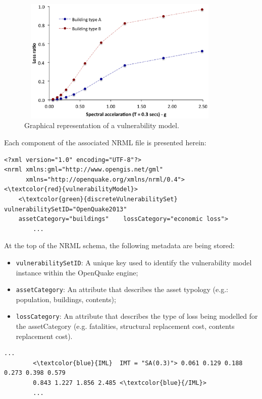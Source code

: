 \begin{figure}[ht]
\centering
\includegraphics[width=10cm,height=6cm]{./figures/risk/vulnerabilityModel.eps}
\caption{Graphical representation of a vulnerability model.}
\label{fig:vulModel}
\end{figure}

Each component of the associated NRML file is presented herein:
 
\begin{Verbatim}[frame=single, commandchars=\\\{\}, samepage=true]
<?xml version="1.0" encoding="UTF-8"?>
<nrml xmlns:gml="http://www.opengis.net/gml"
      xmlns="http://openquake.org/xmlns/nrml/0.4">
<\textcolor{red}{vulnerabilityModel}>
    <\textcolor{green}{discreteVulnerabilitySet} vulnerabilitySetID="OpenQuake2013"	
    assetCategory="buildings"    lossCategory="economic loss">
        ...
\end{Verbatim}

At the top of the NRML schema, the following metadata are being stored:
\begin{itemize}
\item  \Verb+vulnerabilitySetID+: A unique key used to identify the \gls{vulnerability model} instance within the OpenQuake engine;
\item  \Verb+assetCategory+: An attribute that describes the asset typology (e.g.: population, buildings, contents);
\item  \Verb+lossCategory+: An attribute that describes the type of loss being modelled for the assetCategory (e.g. fatalities, structural replacement cost, contents replacement cost). 
\end{itemize}

\begin{Verbatim}[frame=single, commandchars=\\\{\}, samepage=true]
    ...
        <\textcolor{blue}{IML}  IMT = "SA(0.3)"> 0.061 0.129 0.188 0.273 0.398 0.579 
        0.843 1.227 1.856 2.485 <\textcolor{blue}{/IML}>
        ...
\end{Verbatim}

